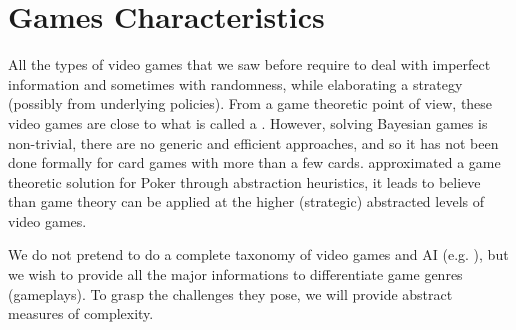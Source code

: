 
\section{Games Characteristics}
All the types of video games that we saw before require to deal with imperfect information and sometimes with randomness, while elaborating a strategy (possibly from underlying policies). From a game theoretic point of view, these video games are close to what is called a  \citep{osborne-rubinstein}. %
However, solving Bayesian games is non-trivial, there are no generic and efficient approaches, and so it has not been done formally for card games with more than a few cards. \citet{BillingsBDHSSS03} approximated a game theoretic solution for Poker through abstraction heuristics, it leads to believe than game theory can be applied at the higher (strategic) abstracted levels of video games.

We do not pretend to do a complete taxonomy of video games and AI (e.g. \citep{gunn}), but we wish to provide all the major informations to differentiate game genres (gameplays). To grasp the challenges they pose, we will provide abstract measures of complexity.

